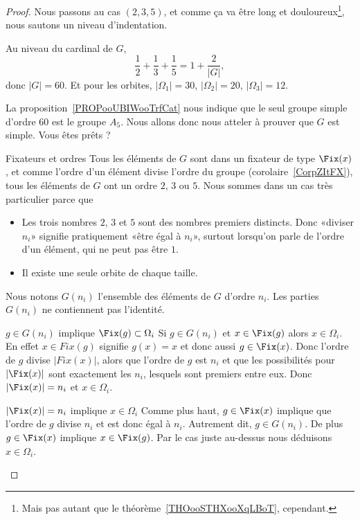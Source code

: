 \begin{proof}
	Nous passons au cas \( (2,3,5)\), et comme ça va être long et douloureux\footnote{Mais pas autant que le théorème~\ref{THOooSTHXooXqLBoT}, cependant.}, nous sautons un niveau d'indentation.

	Au niveau du cardinal de \( G\),
	\begin{equation}
		\frac{1}{ 2 }+\frac{1}{ 3 }+\frac{1}{ 5 }=1+\frac{ 2 }{ | G | },
	\end{equation}
	donc \( | G |=60\). Et pour les orbites, \( | \Omega_1 |=30\), \( | \Omega_2 |=20\), \( | \Omega_3 |=12\).

	La proposition~\ref{PROPooUBIWooTrfCat} nous indique que le seul groupe simple d'ordre \( 60\) est le groupe \( A_5\). Nous allons donc nous atteler à prouver que \( G\) est simple. Vous êtes prêts ?

	\begin{subproof}
		\item[Fixateurs et ordres]
		Tous les éléments de \( G\) sont dans un fixateur de type \( \Fix(x)\), et comme l'ordre d'un élément divise l'ordre du groupe (corolaire~\ref{CorpZItFX}), tous les éléments de \( G\) ont un ordre \( 2\), \( 3\) ou \( 5\). Nous sommes dans un cas très particulier parce que
		\begin{itemize}
			\item Les trois nombres \( 2\), \( 3\) et \( 5\) sont des nombres premiers distincts. Donc «diviser \( n_i\)» signifie pratiquement «être égal à \( n_i\)», surtout lorsqu'on parle de l'ordre d'un élément, qui ne peut pas être \( 1\).
			\item Il existe une seule orbite de chaque taille.
		\end{itemize}
		Nous notons \( G(n_i)\) l'ensemble des éléments de \( G\) d'ordre \( n_i\). Les parties \( G(n_i)\) ne contiennent pas l'identité.

		\item[\( g\in G(n_i)\) implique \( \Fix(g)\subset \Omega_i\)]
		Si \( g\in G(n_i)\) et \( x\in\Fix(g)\) alors \( x\in \Omega_i\). En effet \( x\in Fix(g)\) signifie \( g(x)=x\) et donc aussi \( g\in\Fix(x)\). Donc l'ordre de \( g\) divise \( | Fix(x) |\), alors que l'ordre de \( g\) est \( n_i\) et que les possibilités pour \( | \Fix(x) |\) sont exactement les \( n_i\), lesquels sont premiers entre eux. Donc \( | \Fix(x) |=n_i\) et \( x\in \Omega_i\).

		\item[\( | \Fix(x) |=n_i\) implique \( x\in \Omega_i\)]
		Comme plus haut, \( g\in\Fix(x)\) implique que l'ordre de \( g\) divise \( n_i\) et est donc égal à \( n_i\). Autrement dit, \( g\in G(n_i)\). De plus \( g\in\Fix(x)\) implique \( x\in\Fix(g)\). Par le cas juste au-dessus nous déduisons \( x\in\Omega_i\).


\end{subproof}
\end{proof}
